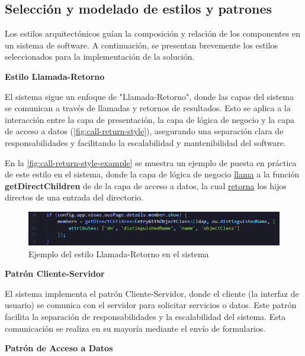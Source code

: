 \subsection{Selección y modelado de estilos y patrones}

Los estilos arquitectónicos guían la composición y relación de los componentes en un sistema de software. A continuación, se presentan brevemente los estilos seleccionados para la implementación de la solución.

\textbf{Estilo Llamada-Retorno}

El sistema sigue un enfoque de "Llamada-Retorno", donde las capas del sistema se comunican a través de llamadas y retornos de resultados. Esto se aplica a la interacción entre la capa de presentación, la capa de lógica de negocio y la capa de acceso a datos (\autoref{fig:call-return-style}), asegurando una separación clara de responsabilidades y facilitando la escalabilidad y mantenibilidad del software.

En la \autoref{fig:call-return-style-example} se muestra un ejemplo de puesta en práctica de este estilo en el sistema, donde la capa de lógica de negocio \underline{llama} a la función \textbf{getDirectChildren} de de la capa de acceso a datos, la cual \underline{retorna} los hijos directos de una entrada  del directorio.

\begin{figure}[th]
    \centering
    \includegraphics[width=\linewidth]{images/code/getDirectChildren-call.png}
    \caption{Ejemplo del estilo Llamada-Retorno en el sistema}
    \label{fig:call-return-style-example}
\end{figure}

\textbf{Patrón Cliente-Servidor}

El sistema implementa el patrón Cliente-Servidor, donde el cliente (la interfaz de usuario) se comunica con el servidor para solicitar servicios o datos. Este patrón facilita la separación de responsabilidades y la escalabilidad del sistema. Esta comunicación se realiza en su mayoría mediante el envío de formularios.

\textbf{Patrón de Acceso a Datos}


